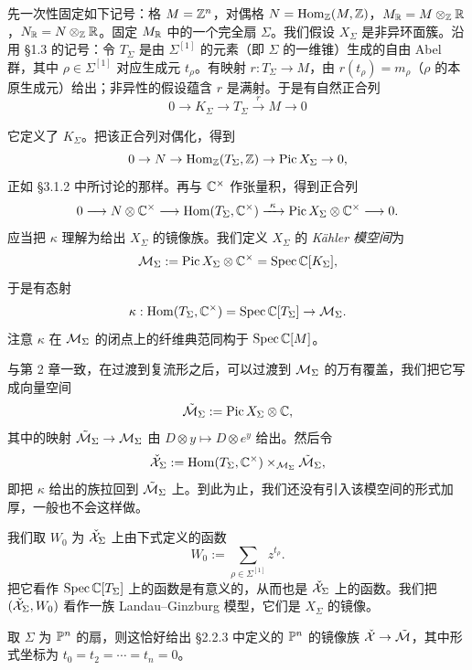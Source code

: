 先一次性固定如下记号：格 $M=\mathbb{Z}^n$，对偶格 $N=\operatorname{Hom}_{\mathbb{Z}}(M,\mathbb{Z})$，$M_{\mathbb{R}}=M\otimes_{\mathbb{Z}}\mathbb{R}$，$N_{\mathbb{R}}=N\otimes_{\mathbb{Z}}\mathbb{R}$。固定 $M_{\mathbb{R}}$ 中的一个完全扇 $\Sigma$。我们假设 $X_\Sigma$ 是非异环面簇。沿用 §1.3 的记号：令 $T_\Sigma$ 是由 $\Sigma^{[1]}$ 的元素（即 $\Sigma$ 的一维锥）生成的自由 Abel 群，其中 $\rho\in\Sigma^{[1]}$ 对应生成元 $t_\rho$。有映射 $r:T_\Sigma\to M$，由 $r(t_\rho)=m_\rho$（$\rho$ 的本原生成元）给出；非异性的假设蕴含 $r$ 是满射。于是有自然正合列
\[
  0\longrightarrow K_\Sigma\longrightarrow T_\Sigma\xrightarrow{\ r\ }M\longrightarrow 0
\]

它定义了 $K_\Sigma$。把该正合列对偶化，得到
\[
  0\to N\to \operatorname{Hom}_{\mathbb{Z}}(T_\Sigma,\mathbb{Z})\to\operatorname{Pic}X_\Sigma\to 0,
\]
正如 §3.1.2 中所讨论的那样。再与 $\mathbb{C}^\times$ 作张量积，得到正合列
\[
  0\longrightarrow N\otimes\C^\times\longrightarrow \operatorname{Hom}(T_\Sigma,\C^\times)
  \xrightarrow{\ \kappa\ }\operatorname{Pic}X_\Sigma\otimes\C^\times\longrightarrow 0.
\]
应当把 $\kappa$ 理解为给出 $X_\Sigma$ 的镜像族。我们定义 $X_\Sigma$ 的 \emph{Kähler 模空间}为
\[
  \mathcal{M}_\Sigma:=\operatorname{Pic}X_\Sigma\otimes\mathbb{C}^\times=\operatorname{Spec}\mathbb{C}[K_\Sigma],
\]
于是有态射
\[
  \kappa:\operatorname{Hom}(T_\Sigma,\mathbb{C}^\times)=\operatorname{Spec}\mathbb{C}[T_\Sigma]\to\mathcal{M}_\Sigma.
\]
注意 $\kappa$ 在 $\mathcal{M}_\Sigma$ 的闭点上的纤维典范同构于 $\operatorname{Spec}\mathbb{C}[M]$。

与第 2 章一致，在过渡到复流形之后，可以过渡到 $\mathcal{M}_\Sigma$ 的万有覆盖，我们把它写成向量空间
\[
  \tilde{\mathcal{M}}_\Sigma:=\operatorname{Pic}X_\Sigma\otimes\mathbb{C},
\]
其中的映射 $\tilde{\mathcal{M}}_\Sigma\to\mathcal{M}_\Sigma$ 由 $D\otimes y\mapsto D\otimes e^y$ 给出。然后令
\[
  \check{\mathcal{X}}_\Sigma:=\operatorname{Hom}(T_\Sigma,\mathbb{C}^\times)\times_{\mathcal{M}_\Sigma}\tilde{\mathcal{M}}_\Sigma,
\]
即把 $\kappa$ 给出的族拉回到 $\tilde{\mathcal{M}}_\Sigma$ 上。到此为止，我们还没有引入该模空间的形式加厚，一般也不会这样做。

我们取 $W_0$ 为 $\check{\mathcal{X}}_\Sigma$ 上由下式定义的函数
\begin{equation}
  W_0:=\sum_{\rho\in\Sigma^{[1]}}z^{t_\rho}. \tag{5.1}
\end{equation}
把它看作 $\operatorname{Spec}\mathbb{C}[T_\Sigma]$ 上的函数是有意义的，从而也是 $\check{\mathcal{X}}_\Sigma$ 上的函数。我们把 $(\check{\mathcal{X}}_\Sigma,W_0)$ 看作一族 Landau--Ginzburg 模型，它们是 $X_\Sigma$ 的镜像。

\begin{example}
取 $\Sigma$ 为 $\mathbb{P}^n$ 的扇，则这恰好给出 §2.2.3 中定义的 $\mathbb{P}^n$ 的镜像族 $\check{\mathcal{X}}\to\tilde{\mathcal{M}}$，其中形式坐标为 $t_0=t_2=\cdots=t_n=0$。
\end{example}

